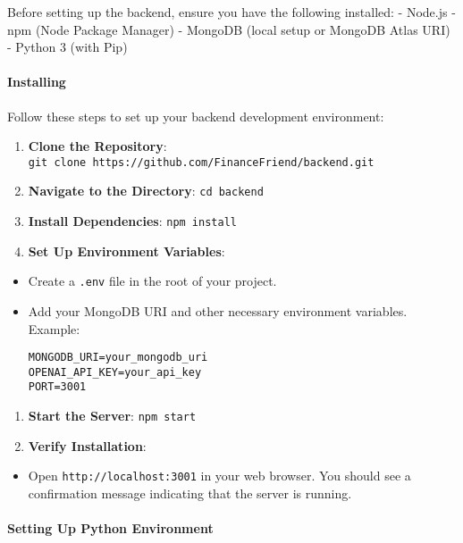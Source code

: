 Before setting up the backend, ensure you have the following installed:
- Node.js - npm (Node Package Manager) - MongoDB (local setup or MongoDB
Atlas URI) - Python 3 (with Pip)

\hypertarget{installing}{%
\paragraph{Installing}\label{installing}}

Follow these steps to set up your backend development environment:

\begin{enumerate}
\def\labelenumi{\arabic{enumi}.}
\item
  \textbf{Clone the Repository}:
  \texttt{git\ clone\ https://github.com/FinanceFriend/backend.git}
\item
  \textbf{Navigate to the Directory}: \texttt{cd\ backend}
\item
  \textbf{Install Dependencies}: \texttt{npm\ install}
\item
  \textbf{Set Up Environment Variables}:
\end{enumerate}

\begin{itemize}
\item
  Create a \texttt{.env} file in the root of your project.
\item
  Add your MongoDB URI and other necessary environment variables.
  Example:

\begin{verbatim}
MONGODB_URI=your_mongodb_uri
OPENAI_API_KEY=your_api_key
PORT=3001
\end{verbatim}
\end{itemize}

\begin{enumerate}
\def\labelenumi{\arabic{enumi}.}
\setcounter{enumi}{4}
\item
  \textbf{Start the Server}: \texttt{npm\ start}
\item
  \textbf{Verify Installation}:
\end{enumerate}

\begin{itemize}
\tightlist
\item
  Open \texttt{http://localhost:3001} in your web browser. You should
  see a confirmation message indicating that the server is running.
\end{itemize}

\hypertarget{setting-up-python-environment}{%
\paragraph{Setting Up Python
Environment}\label{setting-up-python-environment}}

